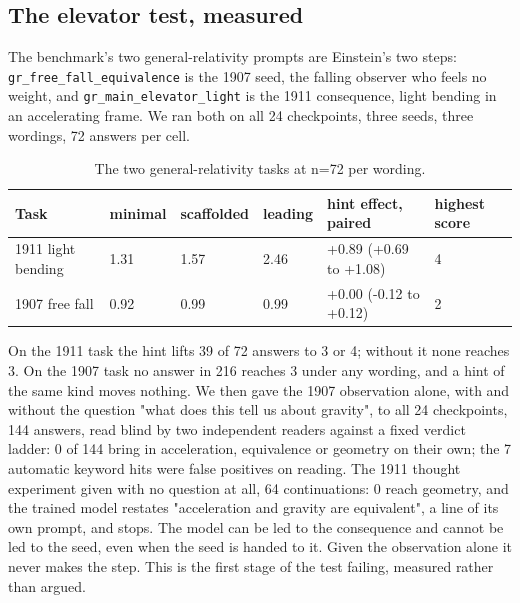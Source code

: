 
\subsection{The elevator test, measured}

The benchmark's two general-relativity prompts are Einstein's two steps: \texttt{gr\_free\_fall\_equivalence} is the 1907 seed, the falling observer who feels no weight, and \texttt{gr\_main\_elevator\_light} is the 1911 consequence, light bending in an accelerating frame. We ran both on all 24 checkpoints, three seeds, three wordings, 72 answers per cell.

\begin{table}[t]
\caption{The two general-relativity tasks at n=72 per wording.}
\begin{ruledtabular}
\begin{tabular}{llllll}
Task & minimal & scaffolded & leading & hint effect, paired & highest score \\
\hline
1911 light bending & 1.31 & 1.57 & 2.46 & +0.89 (+0.69 to +1.08) & 4 \\
1907 free fall & 0.92 & 0.99 & 0.99 & +0.00 (-0.12 to +0.12) & 2 \\
\end{tabular}
\end{ruledtabular}
\end{table}

On the 1911 task the hint lifts 39 of 72 answers to 3 or 4; without it none reaches 3. On the 1907 task no answer in 216 reaches 3 under any wording, and a hint of the same kind moves nothing. We then gave the 1907 observation alone, with and without the question "what does this tell us about gravity", to all 24 checkpoints, 144 answers, read blind by two independent readers against a fixed verdict ladder: 0 of 144 bring in acceleration, equivalence or geometry on their own; the 7 automatic keyword hits were false positives on reading. The 1911 thought experiment given with no question at all, 64 continuations: 0 reach geometry, and the trained model restates "acceleration and gravity are equivalent", a line of its own prompt, and stops. The model can be led to the consequence and cannot be led to the seed, even when the seed is handed to it. Given the observation alone it never makes the step. This is the first stage of the test failing, measured rather than argued.
